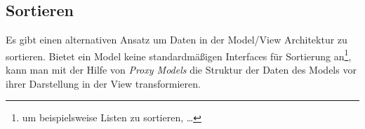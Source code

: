 \documentclass[11pt,a4paper,titlepage]{scrreprt}
\begin{document}
\subsection{Sortieren}
Es gibt einen alternativen Ansatz um Daten in der Model/View Architektur zu sortieren. Bietet
ein Model keine standardmäßigen Interfaces für Sortierung an\footnote{um beispielsweise Listen
zu sortieren, \dots}, kann man mit der Hilfe von {\itshape Proxy Models} die Struktur der Daten
des Models vor ihrer Darstellung in der View transformieren.

\newpage
\nocite{*}
{}

\end{document}
